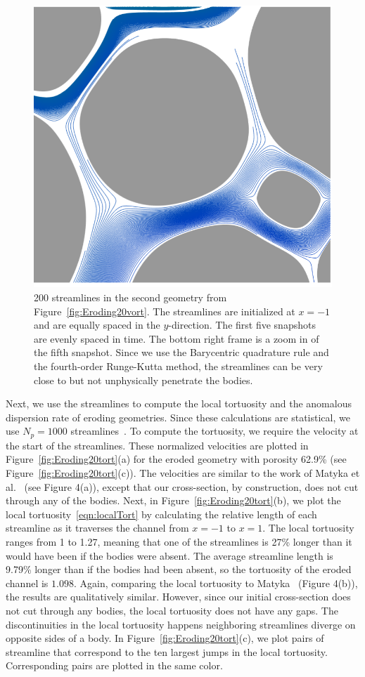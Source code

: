 \documentclass[preprint,10pt]{elsarticle}
\begin{document}
\begin{figure}[H]
\begin{center}
\includegraphics[width = 0.32 \textwidth]{./figs/tracer_20b270_zoom}
\caption{\label{fig:Eroding20tracer} 200 streamlines in the second
geometry from Figure~\ref{fig:Eroding20vort}. The streamlines are
initialized at $x=-1$ and are equally spaced in the $y$-direction. The
first five snapshots are evenly spaced in time.  The bottom right frame
is a zoom in of the fifth snapshot.  Since we use the Barycentric
quadrature rule and the fourth-order Runge-Kutta method, the streamlines
can be very close to but not unphysically penetrate the bodies.}
\end{center}
\end{figure}

Next, we use the streamlines to compute the local tortuosity and the
anomalous dispersion rate of eroding geometries.  Since these
calculations are statistical, we use $N_p = 1000$
streamlines~\cite{bel-sal-rin1992}.  To compute the tortuosity, we
require the velocity at the start of the streamlines.  These normalized
velocities are plotted in Figure~\ref{fig:Eroding20tort}(a) for the
eroded geometry with porosity 62.9\% (see
Figure~\ref{fig:Eroding20tort}(c)).  The velocities are similar to the
work of Matyka et al.~\cite{mat-kha-koz2008} (see Figure 4(a)), except
that our cross-section, by construction, does not cut through any of the
bodies.  Next, in Figure~\ref{fig:Eroding20tort}(b), we plot the local
tortuosity~\eqref{eqn:localTort} by calculating the relative length of
each streamline as it traverses the channel from $x=-1$ to $x=1$.  The
local tortuosity ranges from 1 to 1.27, meaning that one of the
streamlines is 27\% longer than it would have been if the bodies were
absent.  The average streamline length is 9.79\% longer than if the
bodies had been absent, so the tortuosity of the eroded channel is
$1.098$.  Again, comparing the local tortuosity to
Matyka~\cite{mat-kha-koz2008} (Figure 4(b)), the results are
qualitatively similar. However, since our initial cross-section does not
cut through any bodies, the local tortuosity does not have any gaps.
The discontinuities in the local tortuosity happens neighboring
streamlines diverge on opposite sides of a body.  In
Figure~\ref{fig:Eroding20tort}(c), we plot pairs of streamline that
correspond to the ten largest jumps in the local tortuosity.
Corresponding pairs are plotted in the same color.
\end{document}
